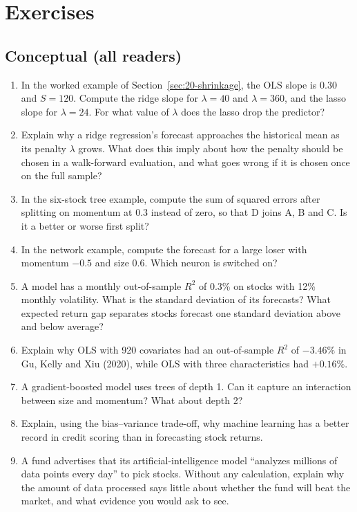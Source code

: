 \section*{Exercises}

\subsection*{Conceptual (all readers)}

\begin{enumerate}
  \item In the worked example of Section~\ref{sec:20-shrinkage}, the OLS slope is 0.30 and $S = 120$. Compute the ridge slope for $\lambda = 40$ and $\lambda = 360$, and the lasso slope for $\lambda = 24$. For what value of $\lambda$ does the lasso drop the predictor?
  \item Explain why a ridge regression's forecast approaches the historical mean as its penalty $\lambda$ grows. What does this imply about how the penalty should be chosen in a walk-forward evaluation, and what goes wrong if it is chosen once on the full sample?
  \item In the six-stock tree example, compute the sum of squared errors after splitting on momentum at $0.3$ instead of zero, so that D joins A, B and C. Is it a better or worse first split?
  \item In the network example, compute the forecast for a large loser with momentum $-0.5$ and size $0.6$. Which neuron is switched on?
  \item A model has a monthly out-of-sample $R^2$ of 0.3\% on stocks with 12\% monthly volatility. What is the standard deviation of its forecasts? What expected return gap separates stocks forecast one standard deviation above and below average?
  \item Explain why OLS with 920 covariates had an out-of-sample $R^2$ of $-3.46\%$ in Gu, Kelly and Xiu (2020), while OLS with three characteristics had $+0.16\%$.
  \item A gradient-boosted model uses trees of depth 1. Can it capture an interaction between size and momentum? What about depth 2?
  \item Explain, using the bias--variance trade-off, why machine learning has a better record in credit scoring than in forecasting stock returns.
  \item A fund advertises that its artificial-intelligence model ``analyzes millions of data points every day'' to pick stocks. Without any calculation, explain why the amount of data processed says little about whether the fund will beat the market, and what evidence you would ask to see.
\end{enumerate}

